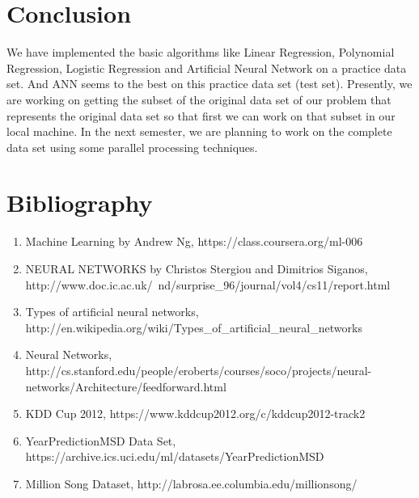 \documentclass[10pt]{article}
\begin{document}
\section{Conclusion}
We have implemented the basic algorithms like Linear Regression, Polynomial Regression, Logistic Regression and Artificial Neural Network on a practice data set. And ANN seems to the best on this practice data set (test set). Presently, we are working on getting the subset of the original data set of our problem that represents the original data set so that first we can work on that subset in our local machine. In the next semester, we are planning to work on the complete data set using some parallel processing techniques.
\section{Bibliography}
\begin{enumerate}
	\item Machine Learning by Andrew Ng, https://class.coursera.org/ml-006
	\item NEURAL NETWORKS by Christos Stergiou and Dimitrios Siganos, \\http://www.doc.ic.ac.uk/~nd/surprise\_96/journal/vol4/cs11/report.html
	\item Types of artificial neural networks, http://en.wikipedia.org/wiki/Types\_of\_artificial\_neural\_networks
	\item Neural Networks, \\http://cs.stanford.edu/people/eroberts/courses/soco/projects/neural-networks/Architecture/feedforward.html
	\item KDD Cup 2012, https://www.kddcup2012.org/c/kddcup2012-track2
	\item YearPredictionMSD Data Set, https://archive.ics.uci.edu/ml/datasets/YearPredictionMSD
	\item Million Song Dataset, http://labrosa.ee.columbia.edu/millionsong/
\end{enumerate}
	

\nocite{*}		

		
\end{document}
